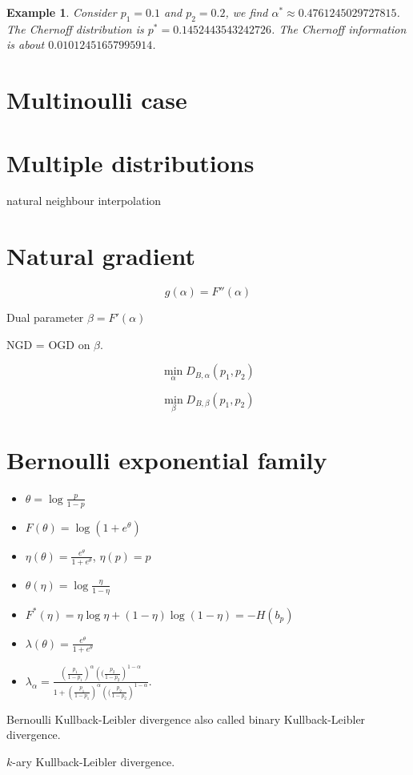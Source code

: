 \documentclass[11pt]{article}
\newtheorem{example}{Example}
\begin{document}
\begin{example}
Consider $p_1=0.1$ and $p_2=0.2$, we find $\alpha^*\approx 0.4761245029727815$.
The Chernoff distribution is $p^*=0.1452443543242726$.
The Chernoff information is about $0.01012451657995914$.
\end{example}
 



\section{Multinoulli case}


\section{Multiple distributions}

natural neighbour interpolation
\cite{NNN-1981}

\section{Natural gradient}

$$
g(\alpha)=F''(\alpha)
$$

Dual parameter $\beta=F'(\alpha)$

NGD = OGD on $\beta$.

$$
\min_\alpha D_{B,\alpha}(p_1,p_2) 
$$

$$
\min_\beta D_{B,\beta}(p_1,p_2) 
$$




\appendix



\section{Bernoulli exponential family}\label{sec:BerEF}

\begin{itemize}

\item $\theta=\log\frac{p}{1-p}$

\item $F(\theta)=\log(1+e^\theta)$

\item $\eta(\theta)=\frac{e^\theta}{1+e^\theta}$, $\eta(p)=p$

\item $\theta(\eta)=\log\frac{\eta}{1-\eta}$

\item $F^*(\eta)=\eta\log\eta+(1-\eta)\log(1-\eta)=-H(b_p)$

\item $\lambda(\theta)=\frac{e^\theta}{1+e^\theta}$

\item $\lambda_\alpha= \frac{\left(\frac{p_1}{1-p_1}\right)^{\alpha}\left((\frac{p_2}{1-p_2}\right)^{1-\alpha}}{1+
\left(\frac{p_1}{1-p_1}\right)^{\alpha}\left((\frac{p_2}{1-p_2}\right)^{1-\alpha}}$.

\end{itemize}

Bernoulli Kullback-Leibler divergence also called binary Kullback-Leibler divergence.

$k$-ary Kullback-Leibler divergence.
\end{document}
